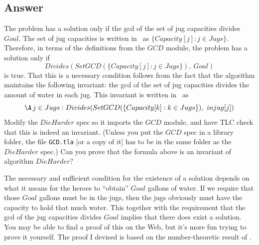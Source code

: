 \documentclass[fleqn,leqno]{article}
\begin{document}
\subsection*{Answer}

The problem has a solution only if the gcd of the set of jug capacities
divides $Goal$.  The set of jug capacities is written in \tlaplus\ as
$\{Capacity[j] : j \in Jugs\}$.  Therefore, in terms of the
definitions from the $GCD$ module, the problem has a solution only if
  \[ Divides(SetGCD(\{Capacity[j] : j \in Jugs\}), \ Goal)
 \]
is true.  That this is a necessary condition follows from the fact
that the algorithm maintains the following invariant: the gcd of the
set of jug capacities divides the amount of water in each jug.  This
invariant is written in \tlaplus\ as
  \[ \A\, j \in Jugs :
       Divides(SetGCD(\{Capacity[k] : k \in Jugs\}), \ injug[j])
  \]
Modify the $DieHarder$ spec so it imports the $GCD$ module, and have
TLC check that this is indeed an invariant.  (Unless you put the $GCD$
spec in a library folder, the file \texttt{GCD.tla} [or a copy of it]
has to be in the same folder as the $DieHarder$ spec.)  Can you
prove that the formula above is an invariant of algorithm $DieHarder$?

\bigskip

The necessary and sufficient condition for the existence of a solution
depends on what it means for the heroes to ``obtain'' $Goal$ gallons
of water.  If we require that those $Goal$ gallons must be in the
jugs, then the jugs obviously must have the capacity to
hold that much water.  This together with the requirement that the gcd
of the jug capacities divides $Goal$ implies that there does exist a
solution.  You may be able to find a proof of this on the Web, but
it's more fun trying to prove it yourself.  The proof I devised is
based on the number-theoretic result of
 .
\end{document}
